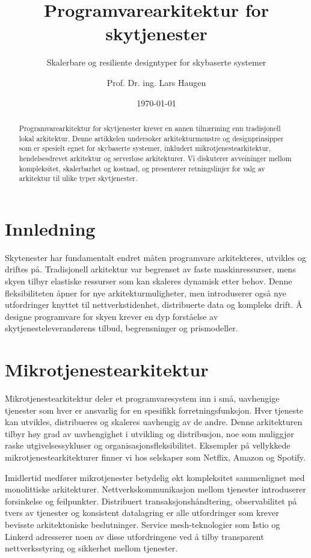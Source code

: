 \documentclass[
    language=norsk,
    doctype=article,
]{../../omnilatex}
\title{Programvarearkitektur for skytjenester}
\subtitle{Skalerbare og resiliente designtyper for skybaserte systemer}
\author{Prof. Dr. ing. Lars Haugen}
\date{\today}
\begin{document}
\maketitle

\begin{abstract}
Programvarearkitektur for skytjenester krever en annen tilnærming enn tradisjonell lokal arkitektur. Denne artikkelen undersøker arkitekturmønstre og designprinsipper som er spesielt egnet for skybaserte systemer, inkludert mikrotjenestearkitektur, hendelsesdrevet arkitektur og serverløse arkitekturer. Vi diskuterer avveininger mellom kompleksitet, skalerbarhet og kostnad, og presenterer retningslinjer for valg av arkitektur til ulike typer skytjenester.
\end{abstract}

\section{Innledning}
Skytenester har fundamentalt endret måten programvare arkitekteres, utvikles og driftes på. Tradisjonell arkitektur var begrenset av faste maskinressurser, mens skyen tilbyr elastiske ressurser som kan skaleres dynamisk etter behov. Denne fleksibiliteten åpner for nye arkitekturmuligheter, men introduserer også nye utfordringer knyttet til nettverkstidenhet, distribuerte data og kompleks drift. Å designe programvare for skyen krever en dyp forståelse av skytjenesteleverandørens tilbud, begrensninger og prismodeller.

\section{Mikrotjenestearkitektur}
Mikrotjenestearkitektur deler et programvaresystem inn i små, uavhengige tjenester som hver er ansvarlig for en spesifikk forretningsfunksjon. Hver tjeneste kan utvikles, distribueres og skaleres uavhengig av de andre. Denne arkitekturen tilbyr høy grad av uavhengighet i utvikling og distribusjon, noe som muliggjør raske utgivelsessykluser og organisasjonsfleksibilitet. Eksempler på vellykkede mikrotjenestearkitekturer finner vi hos selskaper som Netflix, Amazon og Spotify.

Imidlertid medfører mikrotjenester betydelig økt kompleksitet sammenlignet med monolittiske arkitekturer. Nettverkskommunikasjon mellom tjenester introduserer forsinkelse og feilpunkter. Distribuert transaksjonshåndtering, observabilitet på tvers av tjenester og konsistent datalagring er alle utfordringer som krever bevisste arkitektoniske beslutninger. Service mesh-teknologier som Istio og Linkerd adresserer noen av disse utfordringene ved å tilby transparent nettverksstyring og sikkerhet mellom tjenester.
\end{document}

